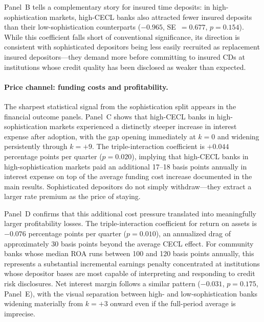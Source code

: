 Panel~B tells a complementary story for insured time deposits: in
high-sophistication markets, high-CECL banks also attracted fewer insured deposits
than their low-sophistication counterparts ($-0.965$, SE~$= 0.677$,
$p = 0.154$).  While this coefficient falls short of conventional significance,
its direction is consistent with sophisticated depositors being less easily
recruited as replacement insured depositors---they demand more before committing
to insured CDs at institutions whose credit quality has been disclosed as weaker
than expected.

\paragraph{Price channel: funding costs and profitability.}
The sharpest statistical signal from the sophistication split appears in the
financial outcome panels.  Panel~C shows that high-CECL banks in
high-sophistication markets experienced a distinctly steeper increase in interest
expense after adoption, with the gap opening immediately at $k=0$ and widening
persistently through $k=+9$.  The triple-interaction coefficient is $+0.044$
percentage points per quarter ($p = 0.020$), implying that high-CECL banks in
high-sophistication markets paid an additional 17--18 basis points annually in
interest expense on top of the average funding cost increase documented in the
main results.  Sophisticated depositors do not simply withdraw---they extract a
larger rate premium as the price of staying.

Panel~D confirms that this additional cost pressure translated into meaningfully
larger profitability losses.  The triple-interaction coefficient for return on
assets is $-0.076$ percentage points per quarter ($p = 0.010$), an annualized
drag of approximately 30 basis points beyond the average CECL effect.  For
community banks whose median ROA runs between 100 and 120 basis points annually,
this represents a substantial incremental earnings penalty concentrated at
institutions whose depositor bases are most capable of interpreting and responding
to credit risk disclosures.  Net interest margin follows a similar pattern
($-0.031$, $p = 0.175$, Panel~E), with the visual separation between high- and
low-sophistication banks widening materially from $k=+3$ onward even if the
full-period average is imprecise.

